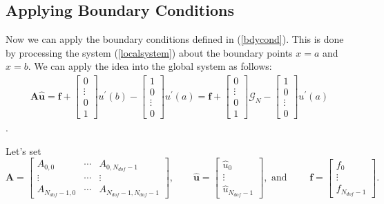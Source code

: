 \subsection{Applying Boundary Conditions}
Now we can apply the boundary conditions defined in (\ref{bdycond}). This is done by processing the system (\ref{localsystem}) about the boundary points $x = a$ and $x = b$. We can apply the idea into the global system as follows:
\begin{eqnarray}
\label{gsystem} {\mathbf A \mathbf{\hat u} = \mathbf f}+
\begin{bmatrix}
    0       \\
    \vdots  \\
    0       \\
    1
\end{bmatrix}
u^{\prime}(b)
-
\begin{bmatrix}
    1       \\
    0       \\
    \vdots  \\
    0
\end{bmatrix}
u^{\prime}(a)
= {\mathbf f}
+
\begin{bmatrix}
    0       \\
    \vdots  \\
    0       \\
    1
\end{bmatrix}
\mathcal{G}_N
-
\begin{bmatrix}
    1       \\
    0       \\
    \vdots  \\
    0
\end{bmatrix}
u^{\prime}(a)
\end{eqnarray}.

Let's set
\begin{equation}
\mathbf{A} =
\begin{bmatrix}
    A_{0,0}         &\cdots     & A_{0,N_{dof}-1}   \\
    \vdots          &\cdots     &\vdots             \\
    A_{N_{dof}-1,0} &\cdots     & A_{N_{dof}-1,N_{dof}-1}
\end{bmatrix},
\qquad
\mathbf{\hat u} =
\begin{bmatrix}
    \hat u_0    \\
    \vdots      \\
    \hat u_{N_{dof}-1}
\end{bmatrix},
\mbox{ and }
\qquad
\mathbf{f} =
\begin{bmatrix}
    f_0    \\
    \vdots \\
    f_{N_{dof}-1}
\end{bmatrix}.
\end{equation}



